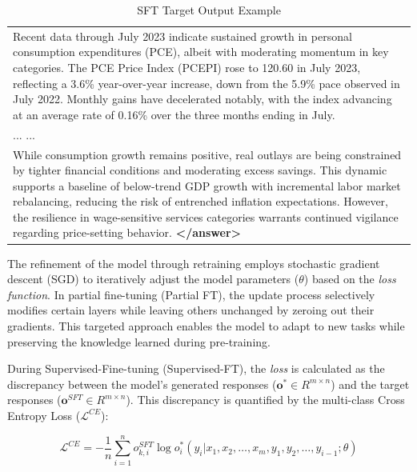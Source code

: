 \begin{table}[h]
\begin{tabular}{p{}}
    Recent data through July 2023 indicate sustained growth in personal consumption expenditures (PCE), albeit with moderating momentum in key categories. The PCE Price Index (PCEPI) rose to 120.60 in July 2023, reflecting a 3.6\% year-over-year increase, down from the 5.9\% pace observed in July 2022. Monthly gains have decelerated notably, with the index advancing at an average rate of 0.16\% over the three months ending in July. \\

    ... ... \\

    While consumption growth remains positive, real outlays are being constrained by tighter financial conditions and moderating excess savings. This dynamic supports a baseline of below-trend GDP growth with incremental labor market rebalancing, reducing the risk of entrenched inflation expectations. However, the resilience in wage-sensitive services categories warrants continued vigilance regarding price-setting behavior. \textbf{\textless /answer\textgreater} \\
    \bottomrule
    \end{tabular}
    \caption{SFT Target Output Example}
    \label{tab:ch2:sft_target_output_example}
\end{table}


The refinement of the model through retraining employs stochastic gradient descent (SGD) to iteratively adjust the model parameters ($\theta$) based on the \textit{loss function}. In partial fine-tuning (Partial FT), the update process selectively modifies certain layers while leaving others unchanged by zeroing out their gradients. This targeted approach enables the model to adapt to new tasks while preserving the knowledge learned during pre-training.

During Supervised-Fine-tuning (Supervised-FT), the \textit{loss} is calculated as the discrepancy between the model's generated responses ($\bm{o^*} \in R^{m\times n}$) and the target responses ($\bm{o}^{SFT} \in R^{m \times n}$). This discrepancy is quantified by the multi-class Cross Entropy Loss ($\mathcal{L}^{CE}$):


\begin{equation*}
  \mathcal{L}^{CE} = -\frac{1}{n}\sum_{i=1}^{n} o^{SFT}_{k, i}\log  o^*_i(y_i|x_1, x_2, \dots,x_m, y_1, y_2, \dots, y_{i-1}; \theta)
\end{equation*}



